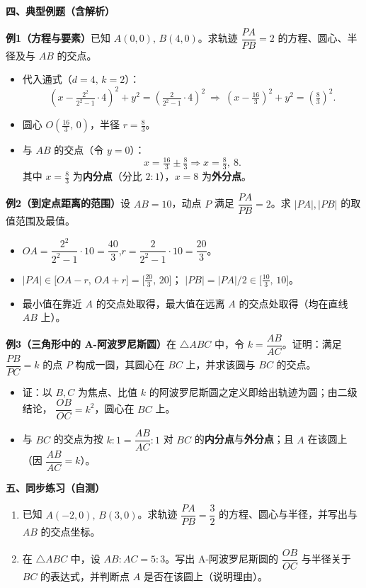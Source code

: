 \documentclass{ctexart}
\begin{document}
   \textbf{四、典型例题（含解析）}
   
   \textbf{例1（方程与要素）}\quad 已知 \(A(0,0),\,B(4,0)\)。求轨迹 \(\dfrac{PA}{PB}=2\) 的方程、圆心、半径及与 \(AB\) 的交点。
   \begin{itemize}
   	\item 代入通式（\(d=4,\,k=2\)）：
   	\[
   	(x-\tfrac{2^2}{2^2-1}\cdot4)^2+y^2=\left(\tfrac{2}{2^2-1}\cdot4\right)^2
   	\ \Longrightarrow\
   	(x-\tfrac{16}{3})^2+y^2=\left(\tfrac{8}{3}\right)^2.
   	\]
   	\item 圆心 \(O\!\left(\tfrac{16}{3},\,0\right)\)，半径 \(r=\tfrac{8}{3}\)。
   	\item 与 \(AB\) 的交点（令 \(y=0\)）：
   	\[
   	x=\tfrac{16}{3}\pm\tfrac{8}{3}\Rightarrow x=\tfrac{8}{3},\ 8.
   	\]
   	其中 \(x=\tfrac{8}{3}\) 为\textbf{内分点}（分比 \(2:1\)），\(x=8\) 为\textbf{外分点}。
   \end{itemize}
   
   \textbf{例2（到定点距离的范围）}\quad 设 \(AB=10\)，动点 \(P\) 满足 \(\dfrac{PA}{PB}=2\)。求 \(\lvert PA\rvert,\lvert PB\rvert\) 的取值范围及最值。
   \begin{itemize}
   	\item \(OA=\dfrac{2^2}{2^2-1}\cdot10=\dfrac{40}{3}\),\quad \(r=\dfrac{2}{2^2-1}\cdot10=\dfrac{20}{3}\)。
   	\item \(\lvert PA\rvert\in\bigl[OA-r,\,OA+r\bigr]=\bigl[\tfrac{20}{3},\,20\bigr]\)；\quad
   	\(\lvert PB\rvert=\lvert PA\rvert/2\in\bigl[\tfrac{10}{3},\,10\bigr]\)。
   	\item 最小值在靠近 \(A\) 的交点处取得，最大值在远离 \(A\) 的交点处取得（均在直线 \(AB\) 上）。
   \end{itemize}
   
   \textbf{例3（三角形中的 A-阿波罗尼斯圆）}\quad 在 \(\triangle ABC\) 中，令 \(k=\dfrac{AB}{AC}\)。证明：满足 \(\dfrac{PB}{PC}=k\) 的点 \(P\) 构成一圆，其圆心在 \(BC\) 上，并求该圆与 \(BC\) 的交点。
   \begin{itemize}
   	\item 证：以 \(B,C\) 为焦点、比值 \(k\) 的阿波罗尼斯圆之定义即给出轨迹为圆；由二级结论，
   	\(\dfrac{OB}{OC}=k^2\)，圆心在 \(BC\) 上。
   	\item 与 \(BC\) 的交点为按 \(k:1=\dfrac{AB}{AC}:1\) 对 \(BC\) 的\textbf{内分点}与\textbf{外分点}；且 \(A\) 在该圆上（因 \(\dfrac{AB}{AC}=k\)）。
   \end{itemize}
   
   \textbf{五、同步练习（自测）}
   \begin{enumerate}
   	\item 已知 \(A(-2,0),\,B(3,0)\)。求轨迹 \(\dfrac{PA}{PB}=\dfrac{3}{2}\) 的方程、圆心与半径，并写出与 \(AB\) 的交点坐标。
   	\item 在 \(\triangle ABC\) 中，设 \(AB:AC=5:3\)。写出 A-阿波罗尼斯圆的 \(\dfrac{OB}{OC}\) 与半径关于 \(BC\) 的表达式，并判断点 \(A\) 是否在该圆上（说明理由）。
   \end{enumerate}
   
\end{document}
